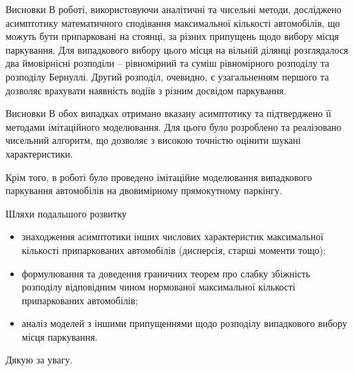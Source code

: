 \begin{frame}{Висновки}
        	В роботі, використовуючи аналітичні та чисельні методи, досліджено асимптотику математичного сподівання максимальної кількості автомобілів, що можуть бути припарковані на стоянці, за різних припущень щодо вибору місця паркування. Для випадкового вибору цього місця на вільній ділянці розглядалося два ймовірнісні розподіли – рівномірний та суміш рівномірного розподілу та розподілу Бернуллі. Другий розподіл, очевидно, є узагальненням першого та дозволяє врахувати наявність водіїв з різним досвідом паркування.

\end{frame}

\begin{frame}{Висновки}
	В обох випадках отримано вказану асимптотику та підтверджено її методами імітаційного моделювання. Для цього було розроблено та реалізовано чисельний алгоритм, що дозволяє з високою точністю оцінити шукані характеристики.
      
        Крім того, в роботі було проведено імітаційне моделювання випадкового паркування автомобілів на двовимірному прямокутному паркінгу.

\end{frame}

\begin{frame}{Шляхи подальшого розвитку}
	\begin{itemize}
		\item знаходження асимптотики інших числових характеристик максимальної кількості припаркованих автомобілів (дисперсія, старші моменти тощо);
		\item формулювання та доведення граничних теорем про слабку збіжність розподілу відповідним чином нормованої максимальної кількості припаркованих автомобілів;
		\item аналіз моделей з іншими припущеннями щодо розподілу випадкового вибору місця паркування. 
	\end{itemize}
\end{frame}

\begin{frame}
	\centering
	\Large Дякую за увагу.

\end{frame}